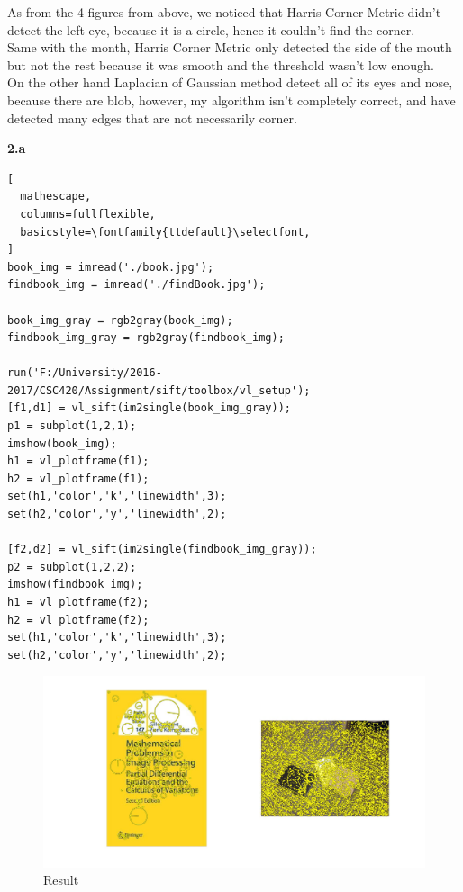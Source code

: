 \documentclass[11pt]{article}
\begin{document}
\noindent
As from the 4 figures from above, we noticed that Harris Corner Metric didn't detect the left eye, because it is a circle, hence it couldn't find the corner.\\

\noindent
Same with the month, Harris Corner Metric only detected the side of the mouth but not the rest because it was smooth and the threshold wasn't low enough.\\

\noindent
On the other hand Laplacian of Gaussian method detect all of its eyes and nose, because there are blob, however, my algorithm isn't completely correct, and have detected many edges that are not necessarily corner. 

\newpage
\noindent
\textbf{2.a} \\
\begin{lstlisting}[
  mathescape,
  columns=fullflexible,
  basicstyle=\fontfamily{ttdefault}\selectfont,
]
book_img = imread('./book.jpg');
findbook_img = imread('./findBook.jpg');

book_img_gray = rgb2gray(book_img);
findbook_img_gray = rgb2gray(findbook_img);

run('F:/University/2016-2017/CSC420/Assignment/sift/toolbox/vl_setup');
[f1,d1] = vl_sift(im2single(book_img_gray));
p1 = subplot(1,2,1);
imshow(book_img);
h1 = vl_plotframe(f1);
h2 = vl_plotframe(f1);
set(h1,'color','k','linewidth',3);
set(h2,'color','y','linewidth',2);

[f2,d2] = vl_sift(im2single(findbook_img_gray));
p2 = subplot(1,2,2);
imshow(findbook_img);
h1 = vl_plotframe(f2);
h2 = vl_plotframe(f2);
set(h1,'color','k','linewidth',3);
set(h2,'color','y','linewidth',2);
\end{lstlisting}

\begin{figure}[h]
  \caption{Result}
    \includegraphics[width=1\textwidth]{2a}
\end{figure}
\end{document}

